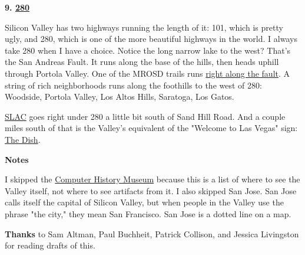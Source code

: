 \textbf{9.
                      \href{http://maps.google.com/maps?q=interstate+280+san+mateo}{280}}

Silicon Valley has two highways running the
                    length of it: 101, which is pretty ugly, and 280, which is
                    one of the more beautiful highways in the world. I always
                    take 280 when I have a choice. Notice the long narrow lake
                    to the west? That's the San Andreas Fault. It runs along the
                    base of the hills, then heads uphill through Portola Valley.
                    One of the MROSD trails runs
                    \href{http://www.openspace.org/preserves/pr\_los\_trancos.asp}{right along the fault}. A string of rich neighborhoods runs along the foothills
                    to the west of 280: Woodside, Portola Valley, Los Altos
                    Hills, Saratoga, Los Gatos.

\href{http://www.flickr.com/photos/38037974@N00/3890299362/}{SLAC}
                    goes right under 280 a little bit south of Sand Hill Road.
                    And a couple miles south of that is the Valley's equivalent
                    of the "Welcome to Las Vegas" sign:
                    \href{http://www.flickr.com/photos/paulbarroga/3443486941/}{The Dish}.




                    \textbf{Notes}

I skipped the
                    \href{http://www.computerhistory.org/}{Computer History Museum}
                    because this is a list of where to see the Valley itself,
                    not where to see artifacts from it. I also skipped San Jose.
                    San Jose calls itself the capital of Silicon Valley, but
                    when people in the Valley use the phrase "the city," they
                    mean San Francisco. San Jose is a dotted line on a map.

\textbf{Thanks}
                    to Sam Altman, Paul Buchheit, Patrick Collison, and Jessica
                    Livingston for reading drafts of this.



              
            
          
            
              
                


                  
              
            
          
